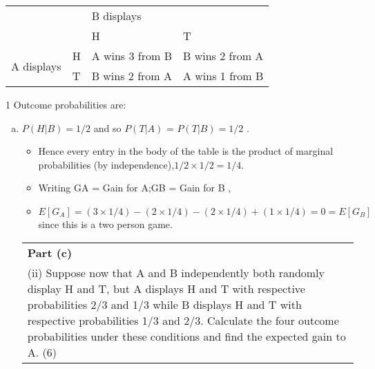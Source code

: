 \documentclass[a4paper,12pt]{article}
\begin{document}
  
\begin{framed}
 
 
  

\begin{table}
\centering
\begin{tabular}{llll}
\multicolumn{2}{l}{}   & \multicolumn{2}{l}{B displays} \\
\multicolumn{2}{l}{}   & H      & T      \\
\multirow{2}{*}{A displays} & H & A wins 3 from B & B wins 2 from A \\
       & T & B wins 2 from A & A wins 1 from B
\end{tabular}
\end{table}


1 Outcome probabilities are:
\begin{enumerate}[(a)]
 \item  $P(H|B) = 1/2$ and so $P(T|A)$ = $P(T|B) = 1/2$ .
\begin{itemize}
\item Hence every entry in the body of the table is the product of marginal probabilities (by
independence),$1/2 \times 1/2 = 1/4$.
\item Writing GA = Gain for A;GB = Gain for B ,
\item $E[G_A] = (3 \times 1/4) - (2 \times 1/4) - (2 \times 1/4) + (1 \times 1/4) = 0 = E[G_B]$
since this is a two person game.
\end{itemize}

 
  \begin{table}[ht!]
  \centering
  \begin{tabular}{|p{15cm}|}
  \hline  
  \noindent \textbf{Part (c)} \\
 (ii) Suppose now that A and B independently both randomly display H and T, but A displays H and T with respective probabilities 2/3 and 1/3 while B displays H and T with respective probabilities 1/3 and 2/3.  Calculate the four outcome probabilities under these conditions and find the expected gain to A. (6) 
 \\ \hline 
   \end{tabular}
 \end{table}


\end{enumerate}
\end{framed}
\end{document}

